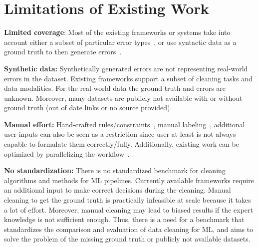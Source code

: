\newpage

\section{Limitations of Existing Work}
\label{sec:limitations_of_existing_work}

\textbf{Limited coverage}: Most of the existing frameworks or systems take into account either a subset of particular error types~\cite{boostclean, raha, baran, jenga}, or use syntactic data as a ground truth to then generate errors~\cite{RestatGCS2022, bart}.

\textbf{Synthetic data:} 
Synthetically generated errors are not representing real-world errors in the dataset. Existing frameworks support a subset of cleaning tasks and data modalities.
For the real-world data the ground truth and errors are unknown. Moreover, many datasets are publicly not available with or without ground truth (out of date links or no source provided).

\textbf{Manual effort:} 
Hand-crafted rules/constraints~\cite{bart, RestatGCS2022}, manual labeling~\cite{raha, baran}, additional user inputs can also be seen as a restriction 
since user at least is not always capable to formulate them correctly/fully. %
Additionally, existing work can be optimized by parallelizing the workflow~\cite{raha, baran, RekatsinasCIR2017, holodetect, RestatGCS2022, jenga}.

\textbf{No standardization:} 
There is no standardized benchmark for cleaning algorithms and methods for ML pipelines. 
Currently available frameworks require an additional input to make correct decisions during the cleaning. 
Manual cleaning to get the ground truth is practically infeasible at scale because it takes a lot of effort.
Moreover, manual cleaning may lead to biased results if the expert knowledge is not sufficient enough.
Thus, there is a need for a benchmark that standardizes the comparison and evaluation of data cleaning for ML, and aims to solve the problem of the missing ground truth or publicly not available datasets.
